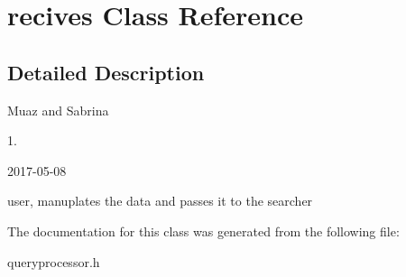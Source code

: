 \hypertarget{classrecives}{}\section{recives Class Reference}
\label{classrecives}


\subsection{Detailed Description}
Muaz and Sabrina

1.

2017-\/05-\/08

user, manuplates the data and passes it to the searcher 

The documentation for this class was generated from the following file\+:\begin{DoxyCompactItemize}
\item 
queryprocessor.\+h\end{DoxyCompactItemize}
